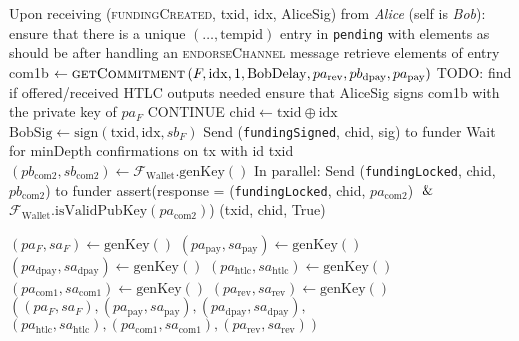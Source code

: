 \begin{algorithmic}[1]
    \State {} Upon receiving (\textsc{fundingCreated}, txid, idx,
    AliceSig) from \textit{Alice} (self is \textit{Bob}):
      \State ensure that there is a unique $\left(\dots, \mathrm{tempid}\right)$
      entry in \texttt{pending} with elements as should be after handling an
      \textsc{endorseChannel} message
      \State retrieve elements of entry
      \State com1b $\gets \textsc{getCommitment}\left(F, \mathrm{idx}, 1,
      \mathrm{BobDelay}, pa_{\mathrm{rev}}, pb_{\mathrm{dpay}},
      pa_{\mathrm{pay}}\right)$ TODO: find if offered/received HTLC outputs
      needed
      \State ensure that AliceSig signs com1b with the private key of $pa_F$
      \State CONTINUE
      \State $\mathrm{chid} \gets \mathrm{txid} \oplus \mathrm{idx}$
      \State $\mathrm{BobSig} \gets \mathrm{sign}\left(\mathrm{txid},
      \mathrm{idx}, sb_F\right)$
      \State Send (\texttt{fundingSigned}, chid, sig) to funder
      \State Wait for minDepth confirmations on tx with id txid
      \State $\left(pb_{\mathrm{com}2}, sb_{\mathrm{com}2}\right) \gets
      \mathcal{F}_{\mathrm{Wallet}}.\mathrm{genKey}\left(\right)$
      \State In parallel:
      \Indent
        \State Send (\texttt{fundingLocked}, chid, $pb_{\mathrm{com}2}$) to
        funder
        \State assert(response = (\texttt{fundingLocked}, chid,
        $pa_{\mathrm{com}2}$) $\And$
        \Indent
          \State $\mathcal{F}_{\mathrm{Wallet}}.\mathrm{isValidPubKey}
          \left(pa_{\mathrm{com}2}\right)$)
        \EndIndent
      \EndIndent
      \State \Return (txid, chid, True)
    \State

      \State $\left(pa_F, sa_F\right) \gets \mathrm{genKey}\left(\right)$
      \State $\left(pa_{\mathrm{pay}}, sa_{\mathrm{pay}}\right) \gets
      \mathrm{genKey}\left(\right)$ 
      \State $\left(pa_{\mathrm{dpay}}, sa_{\mathrm{dpay}}\right) \gets
      \mathrm{genKey}\left(\right)$ 
      \State $\left(pa_{\mathrm{htlc}}, sa_{\mathrm{htlc}}\right) \gets
      \mathrm{genKey}\left(\right)$ 
      \State $\left(pa_{\mathrm{com}1}, sa_{\mathrm{com}1}\right) \gets
      \mathrm{genKey}\left(\right)$ 
      \State $\left(pa_{\mathrm{rev}}, sa_{\mathrm{rev}}\right) \gets
      \mathrm{genKey}\left(\right)$ 
      \State \Return $\left(\left(pa_F, sa_F\right), \left(pa_{\mathrm{pay}},
      sa_{\mathrm{pay}}\right), \left(pa_{\mathrm{dpay}},
      sa_{\mathrm{dpay}}\right),\right.$
      \Indent
        \State $\left.\left(pa_{\mathrm{htlc}}, sa_{\mathrm{htlc}}\right),
        \left(pa_{\mathrm{com}1}, sa_{\mathrm{com}1}\right),
        \left(pa_{\mathrm{rev}}, sa_{\mathrm{rev}}\right)\right)$
      \EndIndent
    \EndFunction
    \State


\end{algorithmic}
